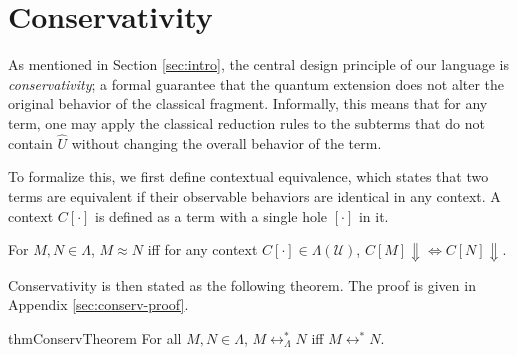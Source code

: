 \section{Conservativity}
As mentioned in Section \ref{sec:intro}, the central design principle of our language is \textit{conservativity}; a formal guarantee that the quantum extension does not alter the original behavior of the classical fragment.
Informally, this means that for any term, one may apply the classical reduction rules to the subterms that do not contain $\hat{U}$ without changing the overall behavior of the term.

To formalize this, we first define contextual equivalence, which states that two terms are equivalent if their observable behaviors are identical in any context.
A context $C[\cdot]$ is defined as a term with a single hole $[\cdot]$ in it.
\begin{dfn} \label{def:contextual-equiv}
  For $M, N \in \Lambda$, $M\approx N$ iff for any context $C[\cdot]\in\Lambda(\mathcal{U})$, $C[M] \Downarrow \Leftrightarrow C[N] \Downarrow$.
\end{dfn}

Conservativity is then stated as the following theorem.
The proof is given in Appendix \ref{sec:conserv-proof}.
\begin{restatable}[Conservativity]{thm}{ConservTheorem} \label{thm:conservativity}
  For all $M, N \in \Lambda$, $M \longleftrightarrow^*_\Lambda N$ iff $M \longleftrightarrow^* N$.
\end{restatable}
